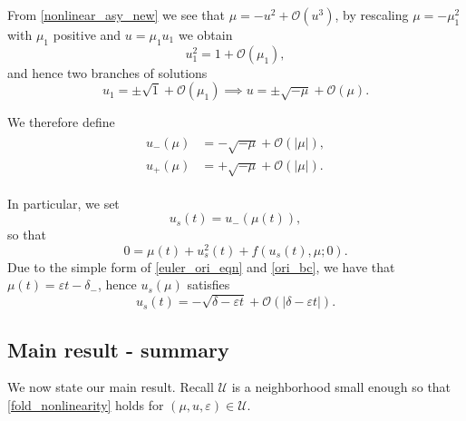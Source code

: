 \documentclass[letterpaper,11pt]{article}
\newcommand{\rmO}{\mathcal{O}}
\newcommand{\eps}{\varepsilon}
\numberwithin{equation}{section}
\theoremstyle{plain}
\begin{document}
From \eqref{nonlinear_asy_new} we see that $\mu = -u^2+\rmO(u^3)$, by rescaling $\mu = -\mu_1^2$ with $\mu_1$ positive and $u=\mu_1 u_1$ we obtain
\[
u_1^2 = 1 + \rmO(\mu_1),
\]
and hence two branches of solutions
\[
u_1 = \pm \sqrt{1}+\rmO(\mu_1) \implies u = \pm \sqrt{-\mu}+\rmO(\mu).
\]

We therefore define
\begin{align}
\begin{split}
u_-(\mu) &= -\sqrt{-\mu} + \rmO(|\mu|),\\
u_+(\mu) &= +\sqrt{-\mu} + \rmO(|\mu|).
\end{split}
\end{align}


In particular, we set
\begin{equation}\label{singular}
u_s(t)=u_-(\mu(t)) ,
\end{equation}
so that
\[
0 = \mu(t) + u_s^2(t)+f(u_s(t),\mu; 0).
\]
Due to the simple form of \eqref{euler_ori_eqn} and \eqref{ori_bc}, we have that $\mu(t)= \eps t-\delta_-$, hence $u_s(\mu)$ satisfies
\begin{equation}\label{singularAsy}
u_s(t) = -\sqrt{\delta-\eps t} + \rmO(|\delta-\eps t|).
\end{equation}


\subsection{Main result - summary} \label{main_sum}

We now state our main result. Recall $\mathcal{U}$ is a neighborhood small enough so that \eqref{fold_nonlinearity} holds for $(\mu, u , \eps) \in \mathcal{U}$.
\end{document}
